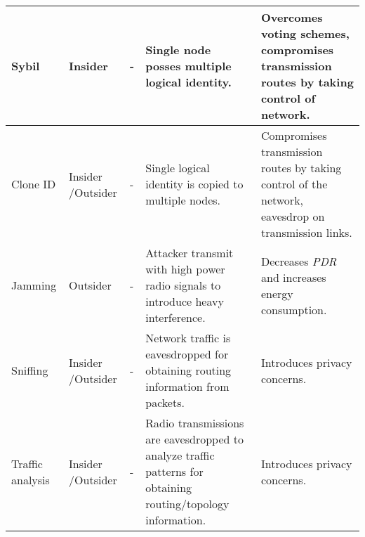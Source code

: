 \documentclass[10pt,journal,sort & compress]{IEEEtran}
\begin{document}
\begin{table*}
\begin{supertabular}[l]{|p{1.6cm}|p{1.3cm}|p{1.5cm}|p{5.8cm}|p{5.8cm}|}
		Sybil                         & Insider          & -                            & Single node posses multiple logical identity.                                                                                                                                                       & Overcomes voting schemes, compromises transmission routes by taking control of network.                                                                                                                               \\ \hline
		Clone ID                      & Insider
		/Outsider & -                            & Single logical identity is copied to multiple nodes.                                                                                                                                                 & Compromises transmission routes by taking control of the network, eavesdrop on transmission links.                                                                                                                         \\ \hline
		Jamming                       & Outsider         & -                            & Attacker transmit with high power radio signals to introduce heavy interference.   & Decreases \textit{PDR} and increases energy consumption.                                                                                                \\ \hline
		Sniffing                      & Insider
		/Outsider & -                            & Network traffic is eavesdropped for obtaining routing information from packets.                                                                                                                     & Introduces privacy concerns.                                                                                                                                                  \\ \hline
		Traffic analysis              & Insider
		/Outsider & -                            & Radio transmissions are eavesdropped to analyze traffic patterns for obtaining routing/topology information.                                                                                      & Introduces privacy concerns.\\ \hline
	\end{supertabular}
\end{table*}
\end{document}
